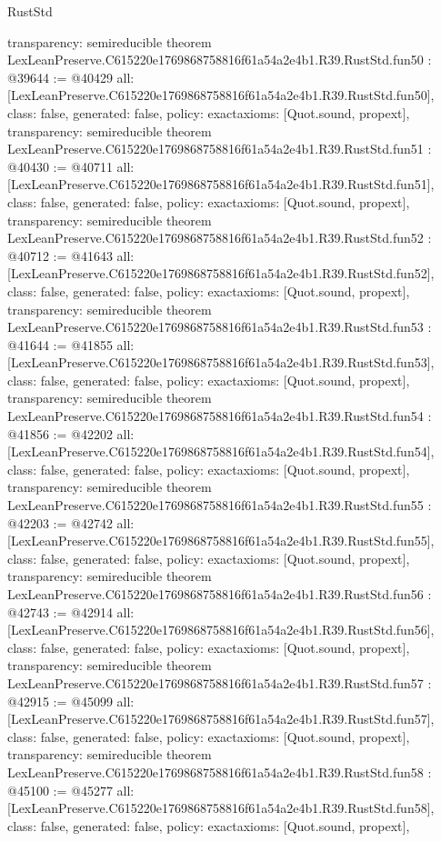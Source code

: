 \begin{lexlean}{RustStd}
\begin{coremodule}
{  transparency: semireducible
}
theorem LexLeanPreserve.C615220e1769868758816f61a54a2e4b1.R39.RustStd.fun50 : @39644 := @40429 {
  all: [LexLeanPreserve.C615220e1769868758816f61a54a2e4b1.R39.RustStd.fun50],
  class: false,
  generated: false,
  policy: exact{axioms: [Quot.sound, propext]},
  transparency: semireducible
}
theorem LexLeanPreserve.C615220e1769868758816f61a54a2e4b1.R39.RustStd.fun51 : @40430 := @40711 {
  all: [LexLeanPreserve.C615220e1769868758816f61a54a2e4b1.R39.RustStd.fun51],
  class: false,
  generated: false,
  policy: exact{axioms: [Quot.sound, propext]},
  transparency: semireducible
}
theorem LexLeanPreserve.C615220e1769868758816f61a54a2e4b1.R39.RustStd.fun52 : @40712 := @41643 {
  all: [LexLeanPreserve.C615220e1769868758816f61a54a2e4b1.R39.RustStd.fun52],
  class: false,
  generated: false,
  policy: exact{axioms: [Quot.sound, propext]},
  transparency: semireducible
}
theorem LexLeanPreserve.C615220e1769868758816f61a54a2e4b1.R39.RustStd.fun53 : @41644 := @41855 {
  all: [LexLeanPreserve.C615220e1769868758816f61a54a2e4b1.R39.RustStd.fun53],
  class: false,
  generated: false,
  policy: exact{axioms: [Quot.sound, propext]},
  transparency: semireducible
}
theorem LexLeanPreserve.C615220e1769868758816f61a54a2e4b1.R39.RustStd.fun54 : @41856 := @42202 {
  all: [LexLeanPreserve.C615220e1769868758816f61a54a2e4b1.R39.RustStd.fun54],
  class: false,
  generated: false,
  policy: exact{axioms: [Quot.sound, propext]},
  transparency: semireducible
}
theorem LexLeanPreserve.C615220e1769868758816f61a54a2e4b1.R39.RustStd.fun55 : @42203 := @42742 {
  all: [LexLeanPreserve.C615220e1769868758816f61a54a2e4b1.R39.RustStd.fun55],
  class: false,
  generated: false,
  policy: exact{axioms: [Quot.sound, propext]},
  transparency: semireducible
}
theorem LexLeanPreserve.C615220e1769868758816f61a54a2e4b1.R39.RustStd.fun56 : @42743 := @42914 {
  all: [LexLeanPreserve.C615220e1769868758816f61a54a2e4b1.R39.RustStd.fun56],
  class: false,
  generated: false,
  policy: exact{axioms: [Quot.sound, propext]},
  transparency: semireducible
}
theorem LexLeanPreserve.C615220e1769868758816f61a54a2e4b1.R39.RustStd.fun57 : @42915 := @45099 {
  all: [LexLeanPreserve.C615220e1769868758816f61a54a2e4b1.R39.RustStd.fun57],
  class: false,
  generated: false,
  policy: exact{axioms: [Quot.sound, propext]},
  transparency: semireducible
}
theorem LexLeanPreserve.C615220e1769868758816f61a54a2e4b1.R39.RustStd.fun58 : @45100 := @45277 {
  all: [LexLeanPreserve.C615220e1769868758816f61a54a2e4b1.R39.RustStd.fun58],
  class: false,
  generated: false,
  policy: exact{axioms: [Quot.sound, propext]},
}
\end{coremodule}
\end{lexlean}
